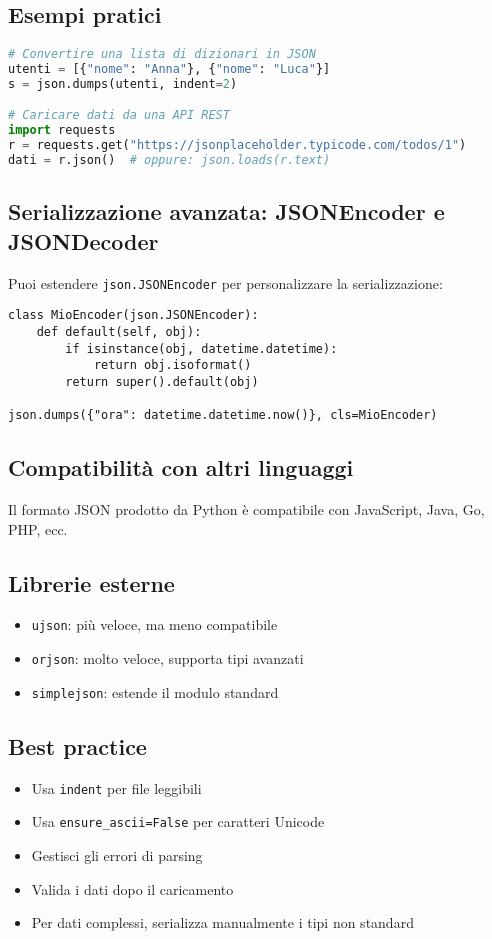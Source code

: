 \documentclass[a4paper,12pt]{article}
\begin{document}
\subsection*{Esempi pratici}
\begin{lstlisting}[language=Python, basicstyle=\ttfamily\footnotesize, breaklines=true, frame=single]
# Convertire una lista di dizionari in JSON
utenti = [{"nome": "Anna"}, {"nome": "Luca"}]
s = json.dumps(utenti, indent=2)

# Caricare dati da una API REST
import requests
r = requests.get("https://jsonplaceholder.typicode.com/todos/1")
dati = r.json()  # oppure: json.loads(r.text)
\end{lstlisting}

\subsection*{Serializzazione avanzata: JSONEncoder e JSONDecoder}
Puoi estendere \texttt{json.JSONEncoder} per personalizzare la serializzazione:
\begin{lstlisting}
class MioEncoder(json.JSONEncoder):
    def default(self, obj):
        if isinstance(obj, datetime.datetime):
            return obj.isoformat()
        return super().default(obj)

json.dumps({"ora": datetime.datetime.now()}, cls=MioEncoder)
\end{lstlisting}

\subsection*{Compatibilità con altri linguaggi}
Il formato JSON prodotto da Python è compatibile con JavaScript, Java, Go, PHP, ecc.

\subsection*{Librerie esterne}
\begin{itemize}
    \item \texttt{ujson}: più veloce, ma meno compatibile
    \item \texttt{orjson}: molto veloce, supporta tipi avanzati
    \item \texttt{simplejson}: estende il modulo standard
\end{itemize}

\subsection*{Best practice}
\begin{itemize}
    \item Usa \texttt{indent} per file leggibili
    \item Usa \texttt{ensure\_ascii=False} per caratteri Unicode
    \item Gestisci gli errori di parsing
    \item Valida i dati dopo il caricamento
    \item Per dati complessi, serializza manualmente i tipi non standard
\end{itemize}
\end{document}
